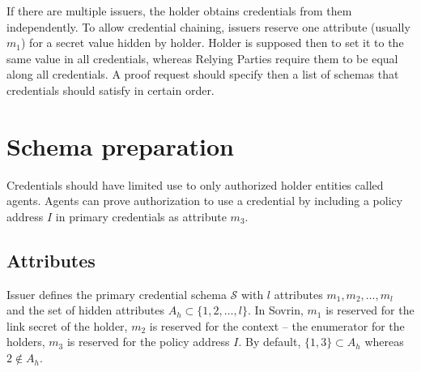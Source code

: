 If there are multiple issuers, the holder obtains  credentials from them independently. To allow credential chaining, issuers reserve one attribute (usually $m_1$)  for a secret value hidden by holder. Holder is supposed then to set it to the same value in all credentials, 
whereas Relying Parties require them to be equal along all credentials. A proof request should specify then a list of schemas that credentials should satisfy in certain order. 

\section{Schema preparation}




 

Credentials should have limited use to only authorized holder entities called agents. Agents can prove authorization to use a credential by including a policy address $I$ in primary credentials as attribute $m_3$.

\begin{comment}
\subsection{Holder setup}
\begin{enumerate}
    \item Generate a random 256-bit link secret $K$ (possibly the same for all issuers). $m_1 \leftarrow K$ for all credentials.
    \item Generate a random 256-bit policy address $I$ (possibly the same for all issuers). $m_3 \leftarrow I$ for all credentials.
\end{enumerate} 


\subsection{Issuer setup}
\end{comment}
\label{sec:iss-setup}

\subsection{Attributes}\label{sec:setup-attr}
Issuer defines the primary credential schema $\mathcal{S}$ with $l$ attributes $m_1,m_2,\ldots, m_l$ and the set of hidden attributes $A_h \subset \{1,2,\ldots,l\}$. In Sovrin, $m_1$ is reserved for the link secret of the holder, $m_2$ is reserved for the context -- the enumerator for the holders, $m_3$ is reserved for the policy address $I$. By default, $\{1,3\}\subset A_h$ whereas $2\notin A_h$.


